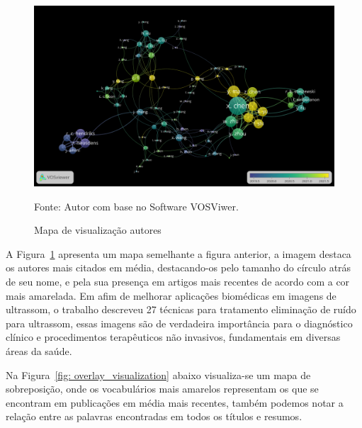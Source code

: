 \begin{figure}[H]
	\centering
	\includegraphics[width=\textwidth,height=\textwidth]{anexos/ris/IEEE/Noise_reduction_and_noise_abatement_andsensor_filtering_algorithm/overlay_visualization_cites.png}
	\caption{Mapa de visualização autores}
	Fonte: Autor com base no Software VOSViwer.
	\label{fig: overlay_visualization_cites}
\end{figure}

A Figura~\ref{fig: overlay_visualization_cites} apresenta um mapa semelhante a figura anterior, a imagem destaca os autores mais citados em média, destacando-os pelo tamanho do círculo atrás de seu nome, e pela sua presença em artigos mais recentes de acordo com a cor mais amarelada.
Em \cite{duarte_speckle_noise} afim de melhorar aplicações biomédicas em imagens de ultrassom, o trabalho descreveu 27 técnicas para tratamento eliminação de ruído para ultrassom, essas imagens são de verdadeira importância para o diagnóstico clínico e procedimentos terapêuticos não invasivos, fundamentais em diversas áreas da saúde.

Na Figura~\ref{fig: overlay_visualization} abaixo visualiza-se um mapa de sobreposição, onde os vocabulários mais amarelos representam os que se encontram em publicações em média mais recentes, também podemos notar a relação entre as palavras encontradas em todos os títulos e resumos.

